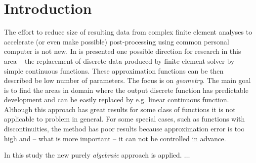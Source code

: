 \section{Introduction}
\label{section:introduction}

The effort to reduce size of resulting data from complex finite element analyses to accelerate (or even make possible) post-processing using common personal computer is not new. In \cite{Benes15} is presented one possible direction for research in this area -- the replacement of discrete data produced by finite element solver by simple continuous functions. These approximation functions can be then described be low number of parameters. The focus is on \textit{geometry}. The main goal is to find the areas in domain where the output discrete function has predictable development and can be easily replaced by e.g. linear continuous function. Although this approach has great results for some class of functions it is not applicable to problem in general. For some special cases, such as functions with discontinuities, the method has poor results because approximation error is too high and -- what is more important -- it can not be controlled in advance.

In this study the new purely \textit{algebraic} approach is applied. ...